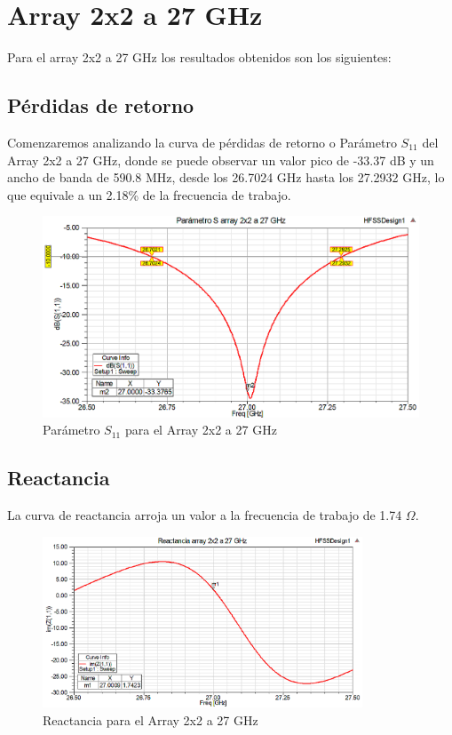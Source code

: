 \section{Array 2x2 a 27 GHz}
\par Para el array 2x2 a 27 GHz los resultados obtenidos son los siguientes:

\subsection{Pérdidas de retorno}
\par Comenzaremos analizando la curva de pérdidas de retorno o Parámetro $S_{11}$ del Array 2x2 a 27 GHz, donde se puede observar un valor pico de -33.37 dB y un ancho de banda de 590.8 MHz, desde los 26.7024 GHz hasta los 27.2932 GHz, lo que equivale a un 2.18\% de la frecuencia de trabajo.
\\
\begin{figure}[H]
    \centering
        \includegraphics[width=\textwidth]{archivos/analisis/2x23/1}
        \caption{Parámetro $S_{11}$ para el Array 2x2 a 27 GHz}
        \label{fig:s2x23}
\end{figure}
\newpage
\subsection{Reactancia}
\par La curva de reactancia arroja un valor a la frecuencia de trabajo de 1.74 $\Omega$.
\\
\begin{figure}[H]
    \centering
        \includegraphics[width=0.85\textwidth]{archivos/analisis/2x23/2}
        \caption{Reactancia para el Array 2x2 a 27 GHz}
        \label{fig:react2x23}
\end{figure}



